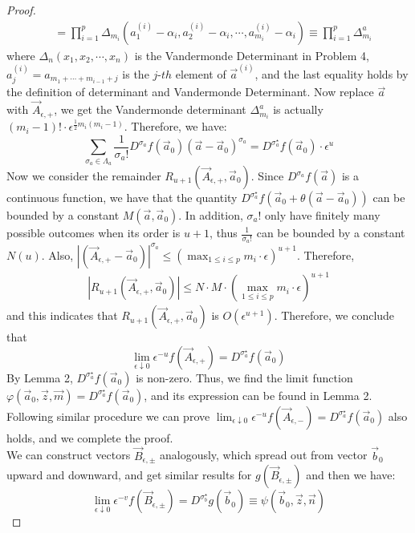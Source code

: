 \begin{proof}
\begin{align*}
	&=\prod_{i=1}^{p}\Delta_{m_i}(a_{1}^{(i)}-\alpha_{i},a_{2}^{(i)}-\alpha_{i},\cdots,a_{m_i}^{(i)}-\alpha_{i})\equiv\prod_{i=1}^{p}\Delta_{m_i}^{a}
\end{align*}
where $\Delta_{n}(x_{1},x_{2},\cdots,x_{n})$ is the Vandermonde Determinant in Problem 4, $a_{j}^{(i)}=a_{m_{1}+\cdots+m_{i-1}+j}$ is the $j$-$th$ element of $\vec{a}^{(i)}$, and the last equality holds by the definition of determinant and Vandermonde Determinant. Now replace $\vec{a}$ with $\vec{A}_{\epsilon,+}$, we get the Vandermonde determinant $\Delta_{m_{i}}^{a}$ is actually $(m_{i}-1)!\cdot\epsilon^{\frac{1}{2}m_{i}(m_{i}-1)}$. Therefore, we have: $$\sum_{\sigma_{a}\in\Lambda_{a}}\frac{1}{\sigma_{a}!}D^{\sigma_{a}}f(\vec{a}_{0})(\vec{a}-\vec{a}_{0})^{\sigma_{a}}=D^{\sigma_{a}^{\star}}f(\vec{a}_{0})\cdot\epsilon^{u}$$
Now we consider the remainder $R_{u+1}(\vec{A}_{\epsilon,+},\vec{a}_{0})$. Since $D^{\sigma_{a}}f(\vec{a})$ is a continuous function, we have that the quantity $D^{\sigma_{a}^{\star}}f(\vec{a}_{0}+\theta(\vec{a}-\vec{a}_{0}))$ can be bounded by a constant $M(\vec{a},\vec{a}_{0})$. In addition, $\sigma_{a}!$ only have finitely many possible outcomes when its order is $u+1$, thus $\frac{1}{\sigma_{a}!}$ can be bounded by a constant $N(u)$. Also, $|(\vec{A}_{\epsilon,+}-\vec{a}_{0})|^{\sigma_{a}}\leqslant (\max_{1\leqslant i\leqslant p}m_{i}\cdot \epsilon)^{u+1}$. Therefore,
\begin{align*}
	|R_{u+1}(\vec{A}_{\epsilon,+},\vec{a}_{0})|\leqslant N\cdot M \cdot (\max_{1\leqslant i\leqslant p}m_{i}\cdot \epsilon)^{u+1}
\end{align*}
and this indicates that $R_{u+1}(\vec{A}_{\epsilon,+},\vec{a}_{0})$ is $O(\epsilon^{u+1})$. Therefore, we conclude that 
$$\lim_{\epsilon\downarrow 0}\epsilon^{-u}f(\vec{A}_{\epsilon,+})=D^{\sigma_{a}^{\star}}f(\vec{a}_{0})$$
By Lemma 2, $D^{\sigma_{a}^{\star}}f(\vec{a}_{0})$ is non-zero. Thus, we find the limit function $\varphi(\vec{a}_{0},\vec{z},\vec{m})=D^{\sigma_{a}^{\star}}f(\vec{a}_{0})$, and its expression can be found in Lemma 2. Following similar procedure we can prove $\lim_{\epsilon\downarrow 0}\epsilon^{-u}f(\vec{A}_{\epsilon,-})=D^{\sigma_{a}^{\star}}f(\vec{a}_{0})$ also holds, and we complete the proof.\\
We can construct vectors $\vec{B}_{\epsilon,\pm}$ analogously, which spread out from vector $\vec{b}_{0}$ upward and downward, and get similar results for $g(\vec{B}_{\epsilon,\pm})$ and then we have:
$$\lim_{\epsilon\downarrow 0}\epsilon^{-v}f(\vec{B}_{\epsilon,\pm})=D^{\sigma_{b}^{\star}}g(\vec{b}_{0})\equiv\psi(\vec{b}_{0},\vec{z},\vec{n})$$

\end{proof}
